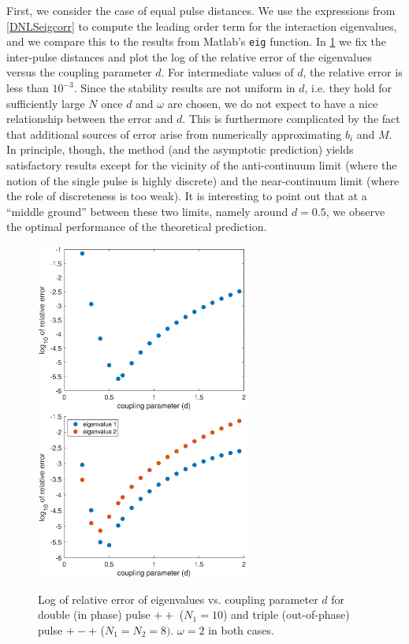 \documentclass[thesis.tex]{subfiles}
\begin{document}
First, we consider the case of equal pulse distances. We use the expressions from \cref{DNLSeigcorr} to compute the leading order term for the interaction eigenvalues, and we compare this to the results from Matlab's \texttt{eig} function. In \cref{fig:error1} we fix the inter-pulse distances and plot the log of the relative error of the eigenvalues versus the coupling parameter $d$. For intermediate values of $d$, the relative error is less than $10^{-3}$. Since the stability results are not uniform in $d$, i.e. they hold for sufficiently large $N$ once $d$ and $\omega$ are chosen, we do not expect to have a nice relationship between the error and $d$. This is furthermore complicated by the fact that additional sources of error arise from  
numerically approximating $b_i$ and $M$. In principle, though, the method (and the asymptotic prediction) yields
satisfactory results except for the vicinity of the 
anti-continuum limit (where the notion of the single
pulse is highly discrete) and the near-continuum limit
(where the role of discreteness is too weak). 
It is interesting to point out that at a ``middle
ground'' between these two limits, namely around $d=0.5$,
we observe the optimal performance of the theoretical
prediction. 

\begin{figure}
\centering
\includegraphics[width=7cm]{images/other/errors1.eps}
\includegraphics[width=7cm]{images/other/errors2.eps}
\caption[Error plot for eigenvalue computations for symmeteric multi-pulses in DNLS]{Log of relative error of eigenvalues vs. coupling parameter $d$ for double (in phase) 
pulse $++$ ($N_1 = 10$) and triple (out-of-phase) pulse $+-+$ ($N_1 = N_2 = 8)$. $\omega = 2$ in both cases.}
\label{fig:error1}
\end{figure}
\end{document}
